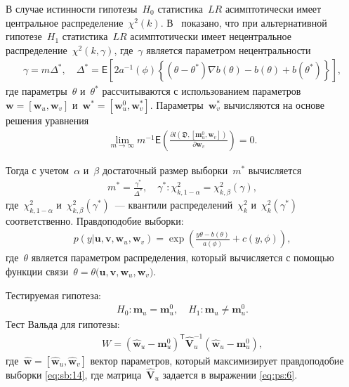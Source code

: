 В случае истинности гипотезы~$H_0$ статистика~$LR$ асимптотически имеет центральное распределение~$\chi^2(k)$. В~\cite{shieh2000} показано, что при альтернативной гипотезе~$H_1$ статистика~$LR$ асимптотически имеет нецентральное распределение~$\chi^2(k,\gamma)$, где~$\gamma$ является параметром нецентральности
\[
\label{eq:sb:11}
\begin{aligned}
	\gamma = m\Delta^*, \quad \Delta^* = \mathsf{E}\left[2a^{-1}(\phi)\left\{\left(\theta - \theta^*\right)\nabla b(\theta) - b(\theta) + b(\theta^*)\right\}\right],
\end{aligned}
\]
где параметры~$\theta$ и~$\theta^*$ рассчитываются с использованием параметров~$\textbf{w} = [\textbf{w}_{u}, \textbf{w}_{v}]$ и~$\textbf{w}^* = [\textbf{w}^{0}_{u}, \textbf{w}^{*}_{v}]$. Параметры~$\textbf{w}^{*}_{v}$ вычисляются на основе решения уравнения
\[
\label{eq:sb:12}
\begin{aligned}
	\lim_{m\to\infty}m^{-1}\mathsf{E}\left(\frac{\partial l\left(\mathfrak{D}, \left[\textbf{m}^{0}_{u}, \textbf{w}_{v}\right]\right)}{\partial \textbf{w}_{v}}\right) = 0.
\end{aligned}
\]

Тогда с учетом~$\alpha$ и~$\beta$ достаточный размер выборки~$m^*$ вычисляется
\[
\label{eq:sb:13}
\begin{aligned}
	m^* = \frac{\gamma^*}{\Delta^*}, \quad \gamma^*:\chi^2_{k, 1-\alpha} = \chi^2_{k, \beta}\left(\gamma\right),
\end{aligned}
\]
где~$\chi^2_{k, 1-\alpha}$ и~$\chi^2_{k, \beta}\left(\gamma^*\right)$~--- квантили распределений~$\chi^{2}_k$ и~$\chi^2_{k}\left(\gamma^*\right)$ соответственно.
Правдоподобие выборки:
\[
\label{eq:sb:14}
\begin{aligned}
	p(y|\textbf{u},\textbf{v},\textbf{w}_{u},\textbf{w}_{v}) = \exp\left(\frac{y\theta- b(\theta)}{a(\phi)} + c\left(y, \phi\right)\right),
\end{aligned}
\]
где~$\theta$ является параметром распределения, который вычисляется с помощью функции связи~$\theta=\theta\bigr(\textbf{u},\textbf{v},\textbf{w}_{u},\textbf{w}_{v}\bigr)$.

Тестируемая гипотеза:
\[
\label{eq:sb:15}
\begin{aligned}
	H_0: \textbf{m}_{u} = \textbf{m}_{u}^{0}, \quad H_1: \textbf{m}_{u} \not=\textbf{m}_{u}^{0}.
\end{aligned}
\]
Тест Вальда для гипотезы:
\[
\label{eq:sb:16}
\begin{aligned}
	W = \left(\hat{\textbf{w}}_{u} - \textbf{m}_{u}^{0}\right)^{\mathsf{T}}\hat{\textbf{V}}_{u}^{-1}\left(\hat{\textbf{w}}_{u} - \textbf{m}_{u}^{0}\right),
\end{aligned}
\]
где~$\hat{\textbf{w}} = [\hat{\textbf{w}}_{u},\hat{\textbf{w}}_{v}]$ вектор параметров, который максимизирует правдоподобие выборки \eqref{eq:sb:14}, где матрица~$\hat{\textbf{V}}_u$ задается в выражении \eqref{eq:ps:6}.

